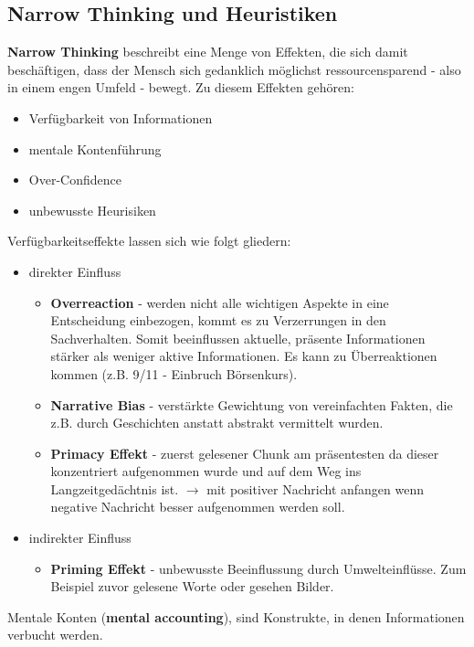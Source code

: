 \subsection{Narrow Thinking und Heuristiken}
\textbf{Narrow Thinking} beschreibt eine Menge von Effekten, die sich damit
beschäftigen, dass der Mensch sich gedanklich möglichst ressourcensparend
- also in einem engen Umfeld - bewegt.
Zu diesem Effekten gehören:
\begin{itemize}
    \item Verfügbarkeit von Informationen
    \item mentale Kontenführung
    \item Over-Confidence
    \item unbewusste Heurisiken
\end{itemize}
Verfügbarkeitseffekte lassen sich wie folgt gliedern:
\begin{itemize}
    \item direkter Einfluss
    \begin{itemize}
        \item \textbf{Overreaction} - werden nicht alle wichtigen Aspekte in eine
            Entscheidung einbezogen, kommt es zu Verzerrungen in den
            Sachverhalten. Somit beeinflussen aktuelle, präsente Informationen
            stärker als weniger aktive Informationen. Es kann zu Überreaktionen
            kommen (z.B. 9/11 - Einbruch Börsenkurs).
        \item \textbf{Narrative Bias} - verstärkte Gewichtung von
            vereinfachten Fakten, die z.B. durch Geschichten anstatt
            abstrakt vermittelt wurden.
        \item \textbf{Primacy Effekt} - zuerst gelesener Chunk am
            präsentesten da dieser konzentriert aufgenommen wurde und
            auf dem Weg ins Langzeitgedächtnis ist. $\rightarrow$ mit
            positiver Nachricht anfangen wenn negative Nachricht besser
            aufgenommen werden soll.
    \end{itemize}
    \item indirekter Einfluss
    \begin{itemize}
        \item \textbf{Priming Effekt} - unbewusste Beeinflussung durch Umwelteinflüsse.
            Zum Beispiel zuvor gelesene Worte oder gesehen Bilder.
    \end{itemize}
\end{itemize}
Mentale Konten (\textbf{mental accounting}), sind Konstrukte, in denen Informationen verbucht werden.
